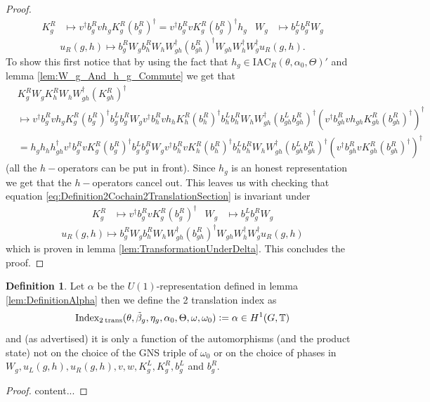 \documentclass[12pt,a4paper,twoside]{article}
\newcommand{\defeq}{\vcentcolon=}
\newcommand{\TT}{\mathbb T}
\theoremstyle{definition}
\newtheorem{definition}[theorem]{Definition}
\numberwithin{equation}{section}
\begin{document}
\begin{proof}
	\begin{align}
		K_g^R&\mapsto v^\dagger b_g^R v h_g K_g^R (b_g^R)^\dagger=v^\dagger b_g^R v K_g^R (b_g^R)^\dagger h_g&W_g&\mapsto b_g^Lb_g^RW_g
	\end{align}
	\begin{equation}
		u_R(g,h)\mapsto b_g^R W_g b_h^R W_h W_{gh}^\dagger (b_{gh}^R)^\dagger W_{gh}W_h^\dagger W_g^\dagger u_R(g,h).
	\end{equation}
	To show this first notice that by using the fact that $h_g\in\textrm{IAC}_R(\theta,\alpha_0,\Theta)'$ and lemma \ref{lem:W_g_And_h_g_Commute} we get that
	\begin{align}
		&K_g^R W_g K_h^R W_ hW_{gh}^\dagger(K_{gh}^R)^\dagger\\
		&\mapsto v^\dagger b_g^R v h_g K_g^R (b_g^R)^\dagger b_g^Lb_g^RW_g v^\dagger b_h^R v h_h K_h^R (b_h^R)^\dagger b_h^Lb_h^RW_h W_{gh}^\dagger (b_{gh}^Lb_{gh}^R)^\dagger (v^\dagger b_{gh}^R v h_{gh} K_{gh}^R (b_{gh}^R)^\dagger)^\dagger\\
		&=h_gh_hh_{gh}^\dagger v^\dagger b_g^R v  K_g^R (b_g^R)^\dagger b_g^Lb_g^RW_g v^\dagger b_h^R v  K_h^R (b_h^R)^\dagger b_h^Lb_h^RW_h W_{gh}^\dagger (b_{gh}^Lb_{gh}^R)^\dagger (v^\dagger b_{gh}^R v  K_{gh}^R (b_{gh}^R)^\dagger)^\dagger
	\end{align}
	(all the $h-$operators can be put in front). Since $h_g$ is an honest representation we get that the $h-$operators cancel out. This leaves us with checking that equation \eqref{eq:Definition2Cochain2TranslationSection} is invariant under
	\begin{align}
		K_g^R&\mapsto v^\dagger b_g^R v K_g^R (b_g^R)^\dagger&W_g&\mapsto b_g^Lb_g^RW_g
	\end{align}
	\begin{equation}
		u_R(g,h)\mapsto b_g^R W_g b_h^R W_h W_{gh}^\dagger (b_{gh}^R)^\dagger W_{gh}W_h^\dagger W_g^\dagger u_R(g,h)
	\end{equation}
	which is proven in lemma \ref{lem:TransformationUnderDelta}. This concludes the proof.
\end{proof}
\begin{definition}
	Let $\alpha$ be the $U(1)$-representation defined in lemma \ref{lem:DefinitionAlpha} then we define the 2 translation index as
	\begin{equation}
		\textrm{Index}_{2\:\text{trans}}(\theta,\tilde{\beta}_g,\eta_g,\alpha_0,\Theta,\omega,\omega_0)\defeq \alpha\in H^1(G,\TT)
	\end{equation}
	and (as advertised) it is only a function of the automorphisms (and the product state) not on the choice of the GNS triple of $\omega_0$ or on the choice of phases in $W_g,u_L(g,h),u_R(g,h),v,w,K^L_g,K^R_g,b^L_g$ and $b^R_g$.
\end{definition}
\begin{proof}
	content...
\end{proof}
\end{document}
